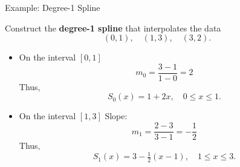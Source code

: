 \documentclass[10pt]{beamer}
\begin{document}
\begin{frame}{Example: Degree-1 Spline}

\begin{example}
Construct the \textbf{degree-1 spline} that interpolates the data
\[
(0,1), \quad
(1,3), \quad
(3,2).
\]
\end{example}

\begin{itemize}
    \item On the interval $[0,1]$ 
\[
m_0 = \frac{3-1}{1-0} = 2
\]
Thus,
\[
S_0(x) = 1 + 2x, \quad 0 \le x \le 1.
\]


\item On the interval $[1,3]$
Slope:
\[
m_1 = \frac{2-3}{3-1} = -\frac12
\]
Thus,
\[
S_1(x) = 3 - \tfrac12(x-1), \quad 1 \le x \le 3.
\]

\end{itemize}


\end{frame}



\end{document}
